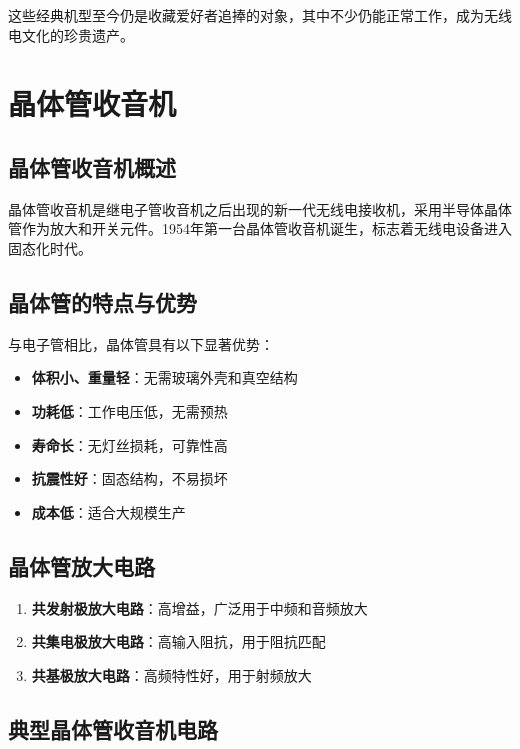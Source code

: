 这些经典机型至今仍是收藏爱好者追捧的对象，其中不少仍能正常工作，成为无线电文化的珍贵遗产。

\section{晶体管收音机}
\label{sec:transistor_radio}

\subsection{晶体管收音机概述}
\label{sec:transistor_radio_intro}

晶体管收音机是继电子管收音机之后出现的新一代无线电接收机，采用半导体晶体管作为放大和开关元件。1954年第一台晶体管收音机诞生，标志着无线电设备进入固态化时代。

\subsection{晶体管的特点与优势}
\label{sec:transistor_features}

与电子管相比，晶体管具有以下显著优势：

\begin{itemize}
    \item \textbf{体积小、重量轻}：无需玻璃外壳和真空结构
    \item \textbf{功耗低}：工作电压低，无需预热
    \item \textbf{寿命长}：无灯丝损耗，可靠性高
    \item \textbf{抗震性好}：固态结构，不易损坏
    \item \textbf{成本低}：适合大规模生产
\end{itemize}

\subsection{晶体管放大电路}
\label{sec:transistor_amplifier}

\begin{enumerate}
    \item \textbf{共发射极放大电路}：高增益，广泛用于中频和音频放大
    \item \textbf{共集电极放大电路}：高输入阻抗，用于阻抗匹配
    \item \textbf{共基极放大电路}：高频特性好，用于射频放大
\end{enumerate}

\subsection{典型晶体管收音机电路}
\label{sec:transistor_circuit_examples}

